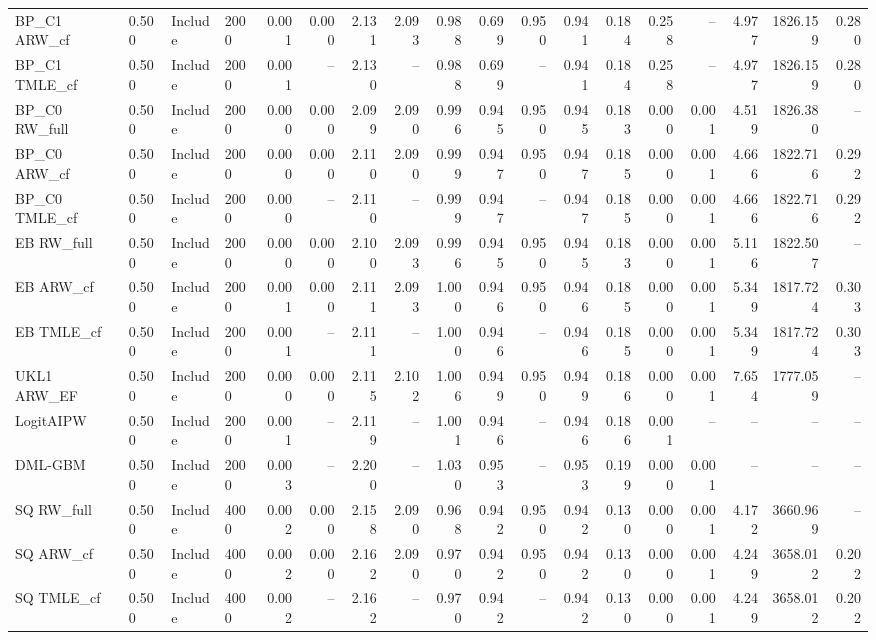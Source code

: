 \begin{tabular}{llllrrrrrrrrrrrrrr}
BP\_C1 ARW\_cf & 0.500 & Include & 2000 & 0.001 & 0.000 & 2.131 & 2.093 & 0.988 & 0.699 & 0.950 & 0.941 & 0.184 & 0.258 & -- & 4.977 & 1826.159 & 0.280 \\
BP\_C1 TMLE\_cf & 0.500 & Include & 2000 & 0.001 & -- & 2.130 & -- & 0.988 & 0.699 & -- & 0.941 & 0.184 & 0.258 & -- & 4.977 & 1826.159 & 0.280 \\
BP\_C0 RW\_full & 0.500 & Include & 2000 & 0.000 & 0.000 & 2.099 & 2.090 & 0.996 & 0.945 & 0.950 & 0.945 & 0.183 & 0.000 & 0.001 & 4.519 & 1826.380 & -- \\
BP\_C0 ARW\_cf & 0.500 & Include & 2000 & 0.000 & 0.000 & 2.110 & 2.090 & 0.999 & 0.947 & 0.950 & 0.947 & 0.185 & 0.000 & 0.001 & 4.666 & 1822.716 & 0.292 \\
BP\_C0 TMLE\_cf & 0.500 & Include & 2000 & 0.000 & -- & 2.110 & -- & 0.999 & 0.947 & -- & 0.947 & 0.185 & 0.000 & 0.001 & 4.666 & 1822.716 & 0.292 \\
EB RW\_full & 0.500 & Include & 2000 & 0.000 & 0.000 & 2.100 & 2.093 & 0.996 & 0.945 & 0.950 & 0.945 & 0.183 & 0.000 & 0.001 & 5.116 & 1822.507 & -- \\
EB ARW\_cf & 0.500 & Include & 2000 & 0.001 & 0.000 & 2.111 & 2.093 & 1.000 & 0.946 & 0.950 & 0.946 & 0.185 & 0.000 & 0.001 & 5.349 & 1817.724 & 0.303 \\
EB TMLE\_cf & 0.500 & Include & 2000 & 0.001 & -- & 2.111 & -- & 1.000 & 0.946 & -- & 0.946 & 0.185 & 0.000 & 0.001 & 5.349 & 1817.724 & 0.303 \\
UKL1 ARW\_EF & 0.500 & Include & 2000 & 0.000 & 0.000 & 2.115 & 2.102 & 1.006 & 0.949 & 0.950 & 0.949 & 0.186 & 0.000 & 0.001 & 7.654 & 1777.059 & -- \\
LogitAIPW & 0.500 & Include & 2000 & 0.001 & -- & 2.119 & -- & 1.001 & 0.946 & -- & 0.946 & 0.186 & 0.001 & -- & -- & -- & -- \\
DML-GBM & 0.500 & Include & 2000 & 0.003 & -- & 2.200 & -- & 1.030 & 0.953 & -- & 0.953 & 0.199 & 0.000 & 0.001 & -- & -- & -- \\
SQ RW\_full & 0.500 & Include & 4000 & 0.002 & 0.000 & 2.158 & 2.090 & 0.968 & 0.942 & 0.950 & 0.942 & 0.130 & 0.000 & 0.001 & 4.172 & 3660.969 & -- \\
SQ ARW\_cf & 0.500 & Include & 4000 & 0.002 & 0.000 & 2.162 & 2.090 & 0.970 & 0.942 & 0.950 & 0.942 & 0.130 & 0.000 & 0.001 & 4.249 & 3658.012 & 0.202 \\
SQ TMLE\_cf & 0.500 & Include & 4000 & 0.002 & -- & 2.162 & -- & 0.970 & 0.942 & -- & 0.942 & 0.130 & 0.000 & 0.001 & 4.249 & 3658.012 & 0.202 \\

\end{tabular}
